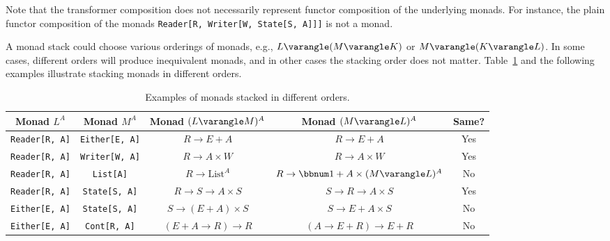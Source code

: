 Note that the transformer composition does not necessarily represent
functor composition of the underlying monads. For instance, the plain
functor composition of the monads \lstinline!Reader[R, Writer[W, State[S, A]]]!
is not a monad.

A monad stack could choose various orderings of monads, e.g., $L\varangle(M\varangle K)$
or $M\varangle(K\varangle L)$. In some cases, different orders will
produce inequivalent monads, and in other cases the stacking order
does not matter. Table~\ref{tab:Examples-of-monad-stacks} and the
following examples illustrate stacking monads in different orders.

\begin{table}
\begin{centering}
\begin{tabular}{|c|c|c|c|c|}
\hline 
\textbf{\small{}Monad $L^{A}$} & \textbf{\small{}Monad $M^{A}$} & \textbf{\small{}Monad $(L\varangle M)^{A}$} & \textbf{\small{}Monad $(M\varangle L)^{A}$} & \textbf{\small{}Same?}\tabularnewline
\hline 
\hline 
{\small{}}\lstinline!Reader[R, A]! & {\small{}}\lstinline!Either[E, A]! & {\small{}$R\rightarrow E+A$} & {\small{}$R\rightarrow E+A$} & {\small{}Yes}\tabularnewline
\hline 
{\small{}}\lstinline!Reader[R, A]! & {\small{}}\lstinline!Writer[W, A]! & {\small{}$R\rightarrow A\times W$} & {\small{}$R\rightarrow A\times W$} & {\small{}Yes}\tabularnewline
\hline 
{\small{}}\lstinline!Reader[R, A]! & {\small{}}\lstinline!List[A]! & {\small{}$R\rightarrow\text{List}^{A}$} & {\small{}$R\rightarrow\bbnum 1+A\times(M\varangle L)^{A}$} & {\small{}No}\tabularnewline
\hline 
{\small{}}\lstinline!Reader[R, A]! & {\small{}}\lstinline!State[S, A]! & {\small{}$R\rightarrow S\rightarrow A\times S$} & {\small{}$S\rightarrow R\rightarrow A\times S$} & {\small{}Yes}\tabularnewline
\hline 
{\small{}}\lstinline!Either[E, A]! & {\small{}}\lstinline!State[S, A]! & {\small{}$S\rightarrow(E+A)\times S$} & {\small{}$S\rightarrow E+A\times S$} & {\small{}No}\tabularnewline
\hline 
{\small{}}\lstinline!Either[E, A]! & {\small{}}\lstinline!Cont[R, A]! & {\small{}$\left(E+A\rightarrow R\right)\rightarrow R$} & {\small{}$\left(A\rightarrow E+R\right)\rightarrow E+R$} & {\small{}No}\tabularnewline
\hline 
\end{tabular}
\par\end{centering}
\caption{\label{tab:Examples-of-monad-stacks}Examples of monads stacked in
different orders.}
\end{table}


